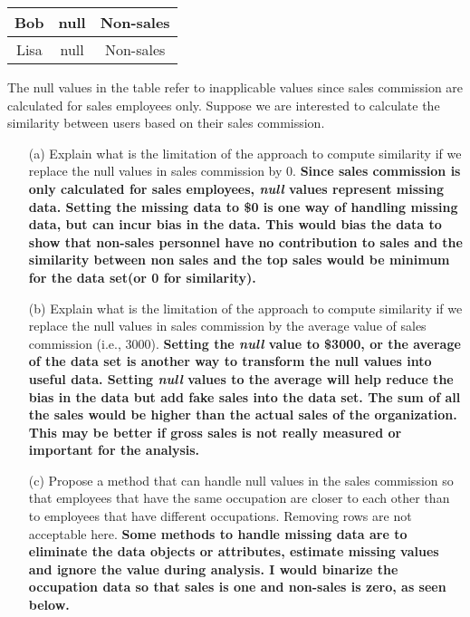 \documentclass{article}
\begin{document}
\begin{itemize}
\begin{center}
\begin{tabular}{|c|c|c|}
            \hline
            Bob & null & Non-sales \\
            \hline
            Lisa & null & Non-sales \\
            \hline
        \end{tabular}
    \end{center}
    The null values in the table refer to inapplicable values since sales commission are calculated for sales employees only. Suppose we are interested to calculate the similarity between users based on their sales commission.
    \begin{itemize}
        \item[(a)] Explain what is the limitation of the approach to compute similarity if we replace the null values in sales commission by 0.
        \textbf{Since sales commission is only calculated for sales employees, \emph{null} values represent missing data.  Setting the missing data to \$0 is one way of handling missing data, but can incur bias in the data.  This would bias the data to show that non-sales personnel have no contribution to sales and the similarity between non sales and the top sales would be minimum for the data set(or 0 for similarity).}
        \item[(b)] Explain what is the limitation of the approach to compute similarity if we replace the null values in sales commission by the average value of sales commission (i.e., 3000).
        \textbf{Setting the \emph{null} value to \$3000, or the average of the data set is another way to transform the null values into useful data.  Setting \emph{null} values to the average will help reduce the bias in the data but add fake sales into the data set.  The sum of all the sales would be higher than the actual sales of the organization. This may be better if gross sales is not really measured or important for the analysis.}
        \item[(c)] Propose a method that can handle null values in the sales commission so that employees that have the same occupation are closer to each other than to employees that have different occupations. Removing rows are not acceptable here. 
        \textbf{Some methods to handle missing data are to eliminate the data objects or attributes, estimate missing values and ignore the value during analysis. I would binarize the occupation data so that sales is one and non-sales is zero, as seen below.}
        \begin{center}
            \begin{tabular}{|c|c|c|c|}
            \hline

\end{tabular}
\end{center}
\end{itemize}
\end{itemize}
\end{document}
